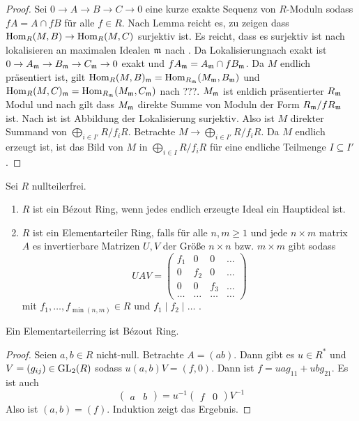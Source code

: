 \begin{proof}
    Sei \(0\to A\to B\to C\to 0\) eine kurze exakte Sequenz von \(R\)-Moduln sodass \(fA=A\cap fB\) für alle \(f\in R\). Nach Lemma  reicht es, zu zeigen dass \(\operatorname{Hom}_R(M,B)\to \operatorname{Hom}_R(M,C)\) surjektiv ist. Es reicht, dass es surjektiv ist nach lokalisieren an maximalen Idealen \(\mathfrak{m}\) nach . Da Lokalisierungnach  exakt ist \(0\to A_{\mathfrak{m}}\to B_{\mathfrak{m}}\to C_{\mathfrak{m}}\to 0\) exakt und \(fA_{\mathfrak{m}}=A_{\mathfrak{m}}\cap fB_{\mathfrak{m}}\).
    Da \(M\) endlich präsentiert ist, gilt \(\operatorname{Hom}_R(M,B)_{\mathfrak{m}}=\operatorname{Hom}_{R_{\mathfrak{m}}}(M_{\mathfrak{m}},B_{\mathfrak{m}})\) und \(\operatorname{Hom}_R(M,C)_{\mathfrak{m}}=\operatorname{Hom}_{R_{\mathfrak{m}}}(M_{\mathfrak{m}},C_{\mathfrak{m}})\) nach ???. \(M_{\mathfrak{m}}\) ist enldich präsentierter \(R_{\mathfrak{m}}\) Modul und nach  gilt dass \(M_{\mathfrak{m}}\) direkte Summe von Moduln der Form \(R_{\mathfrak{m}}/fR_{\mathfrak{m}}\) ist. Nach  ist ist Abbildung der Lokalisierung surjektiv. Also ist \(M\) direkter Summand von \(\bigoplus_{i\in I'}R/f_iR\). Betrachte \(M\to\bigoplus_{i\in I'}R/f_iR\). Da \(M\) endlich erzeugt ist, ist das Bild von \(M\) in \(\bigoplus_{i\in I}R/f_iR\) für eine endliche Teilmenge \(I\subseteq I'\).
\end{proof}
\begin{Def}
    Sei \(R\) nullteilerfrei.
    \begin{enumerate}
        \item \(R\) ist ein Bézout Ring, wenn jedes endlich erzeugte Ideal ein Hauptideal ist.
        \item \(R\) ist ein Elementarteiler Ring, falls für alle \(n,m\geq 1\) und jede
         \(n\times m\) matrix \(A\) es invertierbare Matrizen \(U,V\) der Größe
          \(n\times n\) bzw. \(m\times m\) gibt sodass \[UAV=\begin{pmatrix}
            f_1 & 0& 0& \dots\\ 0& f_2 & 0& \dots \\ 0&0 & f_3& \dots\\ \dots & \dots & \dots & \dots
        \end{pmatrix}\] mit \(f_1,\dots,f_{\min(n,m)}\in R\) und
         \(f_1\mid f_2\mid\dots\) .
    \end{enumerate}
\end{Def}
\begin{Lemma}
    Ein Elementarteilerring ist Bézout Ring.
\end{Lemma}
\begin{proof}
    Seien \(a,b\in R\) nicht-null. Betrachte \(A=(a b)\). Dann gibt es \(u\in R^*\) und \(V=(g_{ij})\in \operatorname{GL}_2(R)\) sodass \(u(a,b)V=(f,0)\).
    Dann ist \(f=uag_{11}+ubg_{21}\). Es ist auch \[\begin{pmatrix}
        a & b    \end{pmatrix}=u^{-1}\begin{pmatrix}
            f & 0
        \end{pmatrix} V^{-1}
\] Also ist \((a,b)=(f)\). Induktion zeigt das Ergebnis.

\end{proof}
